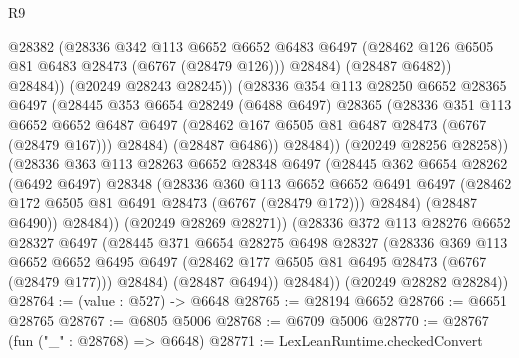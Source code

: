\begin{lexlean}{R9}
\begin{coremodule}
                        @28382
                        (@28336
                          @342
                          @113
                          @6652
                          @6652
                          @6483
                          @6497
                          (@28462 @126 @6505 @81 @6483 @28473 (@6767 (@28479 @126)))
                          @28484)
                        (@28487 @6482))
                      @28484))
                  (@20249 @28243 @28245))
                (@28336
                  @354
                  @113
                  @28250
                  @6652
                  @28365
                  @6497
                  (@28445
                    @353
                    @6654
                    @28249
                    (@6488 @6497)
                    @28365
                    (@28336
                      @351
                      @113
                      @6652
                      @6652
                      @6487
                      @6497
                      (@28462 @167 @6505 @81 @6487 @28473 (@6767 (@28479 @167)))
                      @28484)
                    (@28487 @6486))
                  @28484))
              (@20249 @28256 @28258))
            (@28336
              @363
              @113
              @28263
              @6652
              @28348
              @6497
              (@28445
                @362
                @6654
                @28262
                (@6492 @6497)
                @28348
                (@28336
                  @360
                  @113
                  @6652
                  @6652
                  @6491
                  @6497
                  (@28462 @172 @6505 @81 @6491 @28473 (@6767 (@28479 @172)))
                  @28484)
                (@28487 @6490))
              @28484))
          (@20249 @28269 @28271))
        (@28336
          @372
          @113
          @28276
          @6652
          @28327
          @6497
          (@28445
            @371
            @6654
            @28275
            @6498
            @28327
            (@28336
              @369
              @113
              @6652
              @6652
              @6495
              @6497
              (@28462 @177 @6505 @81 @6495 @28473 (@6767 (@28479 @177)))
              @28484)
            (@28487 @6494))
          @28484))
      (@20249 @28282 @28284))
@28764 := (value : @527) -> @6648
@28765 := @28194 @6652
@28766 := @6651 @28765
@28767 := @6805 @5006
@28768 := @6709 @5006
@28770 := @28767 (fun ("_" : @28768) => @6648)
@28771 := LexLeanRuntime.checkedConvert

\end{coremodule}
\end{lexlean}

